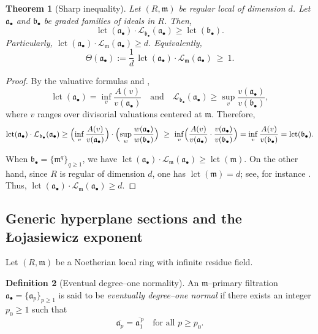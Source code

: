 \documentclass[12pt]{amsart}
\newcommand{\CC}{\mathbb{C}}
\newcommand{\m}{\mathfrak m}
\renewcommand{\a}{\mathfrak{a}}
\renewcommand{\b}{\mathfrak{b}}
\newcommand{\lct}{\operatorname{\mathrm{lct}}}
\newcommand{\Loj}{\mathcal{L}} %
\newcommand{\abul}{{\a_\bullet}}
\newcommand{\bbul}{{\b_\bullet}}
\theoremstyle{plain}
\newtheorem{theorem}{Theorem}[section]
\theoremstyle{definition}
\newtheorem{definition}[theorem]{Definition}
\newtheorem{example}[theorem]{Example}
\numberwithin{equation}{section}
\begin{document}
\begin{theorem}[Sharp inequality]\label{thm:lctL-sharp}
	Let $(R,\m)$ be regular local of dimension $d$. Let $\abul$ and $\bbul$ be graded families of ideals in $R$. Then,
	\[
	\lct(\abul)\cdot \Loj_{\bbul}(\abul) \ge \lct(\bbul).
	\]
	Particularly, $\lct(\abul) \cdot \Loj_{\m}(\abul) \ge d$.
	Equivalently,
	\[
	\Theta(\abul):=\frac{1}{d}\,\lct(\abul)\cdot \Loj_\m(\abul)\ \ge\ 1.
	\]
\end{theorem}

\begin{proof}
	By the valuative formulas and ,
	\[
	\lct(\abul)=\inf_v \frac{A(v)}{v(\abul)}
	\quad\text{and}\quad
	\Loj_{\bbul}(\abul) \ge \sup_v \frac{v(\abul)}{v(\bbul)},
	\]
	where $v$ ranges over divisorial valuations centered at $\m$.
	Therefore,
	\[
	\lct(\abul)\cdot \Loj_{\bbul}(\abul)
	\ge
	\Bigl(\inf_v \frac{A(v)}{v(\abul)}\Bigr)\cdot
	\Bigl(\sup_w \frac{w(\abul)}{w(\bbul)}\Bigr)
	\ \ge\
	\inf_v \Bigl(\frac{A(v)}{v(\abul)}\cdot \frac{v(\abul)}{v(\bbul)}\Bigr)
	=
	\inf_v \frac{A(v)}{v(\bbul)} = \lct(\bbul).
	\]
	
	When $\bbul = \{\m^q\}_{q \ge 1}$, we have $\lct(\abul) \cdot \Loj_{\m}(\abul) \ge \lct(\m)$. On the other hand, since $R$ is regular of dimension $d$, one has $\lct(\m)=d$; see, for instance \cite[\S\,9]{LazPosII}.
	Thus, $\lct(\abul) \cdot \Loj_\m(\abul)\ge d$.
\end{proof}



\subsection{Generic hyperplane sections and the \L{}ojasiewicz exponent}
Let $(R,\m)$ be a Noetherian local ring with infinite residue field. 

\begin{definition}[Eventual degree--one normality]
\label{def:ED1}
An $\m$--primary filtration $\abul=\{\a_p\}_{p\ge1}$ is said to be
\emph{eventually degree--one normal} if there exists an integer $p_0\ge1$
such that
\[
\overline{\a_p}=\overline{\a_1^{\,p}}
\quad \text{for all } p\ge p_0.
\]
\end{definition}
\end{document}
